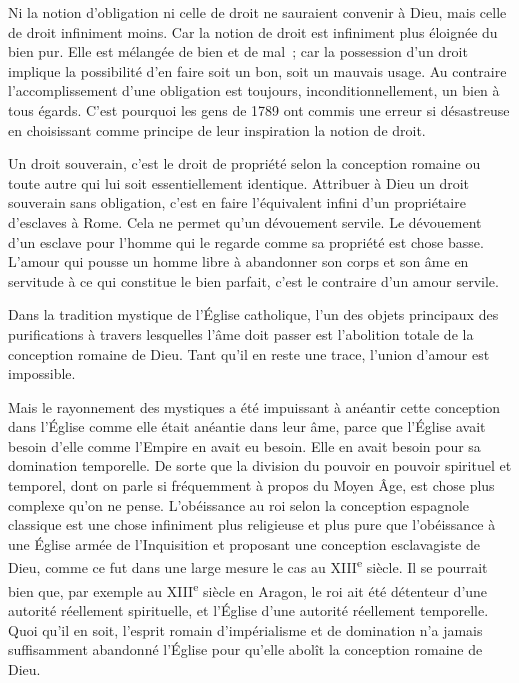 \documentclass[french,twoside]{book} %
\begin{document}
Ni la notion d'obligation ni celle de droit ne sauraient convenir à Dieu, mais celle de droit infiniment moins. Car la notion de droit est infiniment plus éloignée du bien pur. Elle est mélangée de bien et de mal ; car la possession d'un droit implique la possibilité d'en faire soit un bon, soit un mauvais usage. Au contraire l'accomplissement d'une obligation est toujours, inconditionnellement, un bien à tous égards. C'est pourquoi les gens de 1789 ont commis une erreur si désastreuse en choisissant comme principe de leur inspiration la notion de droit.\par
Un droit souverain, c'est le droit de propriété selon la conception romaine ou toute autre qui lui soit essentiellement identique. Attribuer à Dieu un droit souverain sans obligation, c'est en faire l'équivalent infini d'un propriétaire d'esclaves à Rome. Cela ne permet qu'un dévouement servile. Le dévouement d'un esclave pour l'homme qui le regarde comme sa propriété est chose basse. L'amour qui pousse un homme libre à abandonner son corps et son âme en servitude à ce qui constitue le bien parfait, c'est le contraire d'un amour servile.\par
Dans la tradition mystique de l'Église catholique, l'un des objets principaux des purifications à travers lesquelles l'âme doit passer est l'abolition totale de la conception romaine de Dieu. Tant qu'il en reste une trace, l'union d'amour est impossible.\par
Mais le rayonnement des mystiques a été impuissant à anéantir cette conception dans l'Église comme elle était anéantie dans leur âme, parce que l'Église avait besoin d'elle comme l'Empire en avait eu besoin. Elle en avait besoin pour sa domination temporelle. De sorte que la division du pouvoir en pouvoir spirituel et temporel, dont on parle si fréquemment à propos du Moyen Âge, est chose plus complexe qu'on ne pense. L'obéissance au roi selon la conception espagnole classique est une chose infiniment plus religieuse et plus pure que l'obéissance à une Église armée de l'Inquisition et proposant une conception esclavagiste de Dieu, comme ce fut dans une large mesure le cas au XIII\textsuperscript{e} siècle. Il se pourrait bien que, par exemple au XIII\textsuperscript{e} siècle en Aragon, le roi ait été détenteur d'une autorité réellement spirituelle, et l'Église d'une autorité réellement temporelle. Quoi qu'il en soit, l'esprit romain d'impérialisme et de domination n'a jamais suffisamment abandonné l'Église pour qu'elle abolît la conception romaine de Dieu.\par
\end{document}
